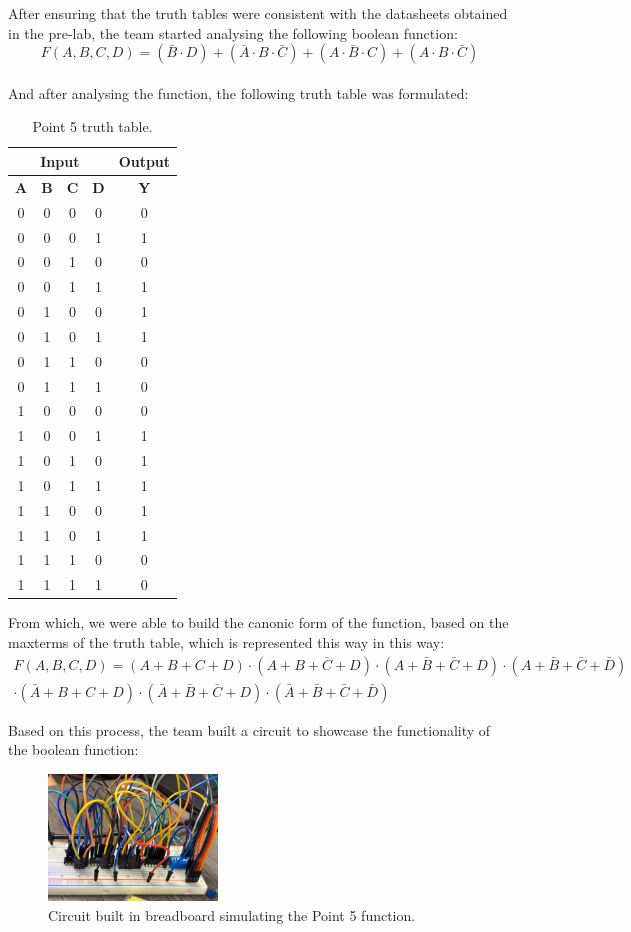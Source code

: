 \documentclass[12pt]{article}  %
\begin{document}
After ensuring that the truth tables were consistent with the datasheets obtained in the pre-lab, the team started analysing the following boolean function:
$$
F(A, B, C, D) = (\bar{B} \cdot D) + (\bar{A} \cdot B \cdot \bar{C}) + (A \cdot \bar{B} \cdot C) + (A \cdot B \cdot \bar{C})
$$ \\
And after analysing the function, the following truth table was formulated:
\begin{table}[h!]
\centering
\begin{tabular}{|c|c|c|c||c|}
\hline
\multicolumn{4}{|c||}{\textbf{Input}} & \textbf{Output} \\
\hline
\textbf{A} & \textbf{B} & \textbf{C} & \textbf{D} & \textbf{Y} \\
\hline
0 & 0 & 0 & 0 & 0 \\
0 & 0 & 0 & 1 & 1 \\
0 & 0 & 1 & 0 & 0 \\
0 & 0 & 1 & 1 & 1 \\
0 & 1 & 0 & 0 & 1 \\
0 & 1 & 0 & 1 & 1 \\
0 & 1 & 1 & 0 & 0 \\
0 & 1 & 1 & 1 & 0 \\
1 & 0 & 0 & 0 & 0 \\
1 & 0 & 0 & 1 & 1 \\
1 & 0 & 1 & 0 & 1 \\
1 & 0 & 1 & 1 & 1 \\
1 & 1 & 0 & 0 & 1 \\
1 & 1 & 0 & 1 & 1 \\
1 & 1 & 1 & 0 & 0 \\
1 & 1 & 1 & 1 & 0 \\
\hline
\end{tabular}
\caption{Point 5 truth table.}
\label{tab:truth_table_point_5}
\end{table}

From which, we were able to build the canonic form of the function, based on the maxterms of the truth table, which is represented this way in this way: 
\begin{multline*}
F(A,B,C,D) = (A+B+C+D) \cdot (A+B+\bar{C}+D) \cdot (A+\bar{B}+\bar{C}+D) \cdot (A+\bar{B}+\bar{C}+\bar{D}) \\
\cdot (\bar{A}+B+C+D) \cdot (\bar{A}+\bar{B}+\bar{C}+D) \cdot (\bar{A}+\bar{B}+\bar{C}+\bar{D})
\end{multline*}

Based on this process, the team built a circuit to showcase the functionality of the boolean function:
\begin{figure}[H]
  \centering
  \includegraphics[width=0.4\textwidth]{Point5.jpg}
  \caption{Circuit built in breadboard simulating the Point 5 function.}
  \label{fig:circuit_point_5}
\end{figure}
\end{document}
